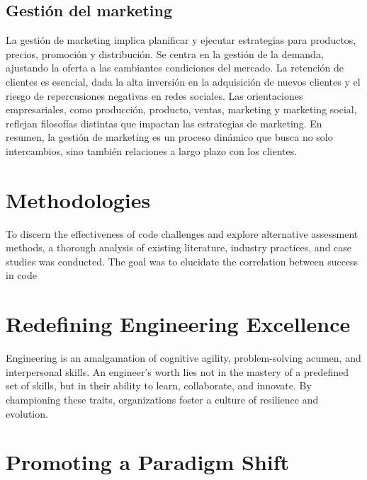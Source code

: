 \documentclass[
    a4paper, %
    10pt, %
    unnumberedsections, %
    twoside, %
]{LTJournalArticle}
\begin{document}
\subsection{Gestión del marketing}

La gestión de marketing implica planificar y ejecutar estrategias para productos, precios, promoción y distribución. Se centra en la gestión de la demanda, ajustando la oferta a las cambiantes condiciones del mercado. La retención de clientes es esencial, dada la alta inversión en la adquisición de nuevos clientes y el riesgo de repercusiones negativas en redes sociales. Las orientaciones empresariales, como producción, producto, ventas, marketing y marketing social, reflejan filosofías distintas que impactan las estrategias de marketing. En resumen, la gestión de marketing es un proceso dinámico que busca no solo intercambios, sino también relaciones a largo plazo con los clientes.





















\section{Methodologies}

To discern the effectiveness of code challenges and explore alternative assessment methods, a thorough analysis of existing literature, industry practices, and case studies was conducted. The goal was to elucidate the correlation between success in code \section{Redefining Engineering Excellence}

Engineering is an amalgamation of cognitive agility, problem-solving acumen, and interpersonal skills. An engineer's worth lies not in the mastery of a predefined set of skills, but in their ability to learn, collaborate, and innovate. By championing these traits, organizations foster a culture of resilience and evolution.

\section{Promoting a Paradigm Shift}
\end{document}
